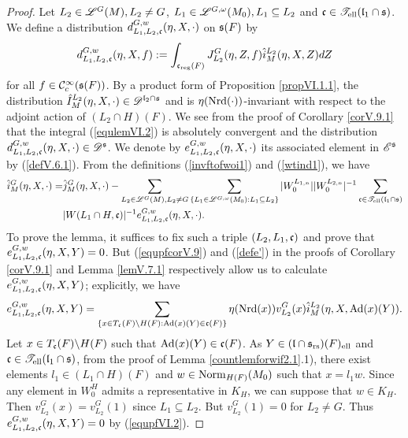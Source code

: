 \documentclass[a4paper]{amsart}
\newcommand{\mse}{\mathscr{E}}\newcommand{\msf}{\mathscr{F}}\newcommand{\msg}{\mathscr{G}}\newcommand{\msh}{\mathscr{H}}
\theoremstyle{definition}
\theoremstyle{remark}
\numberwithin{equation}{subsection}
\begin{document}
\begin{proof}
Let $L_2\in\mathscr{L}^{G}(M), L_2\neq G$, $L_1\in\mathscr{L}^{G, \omega}(M_0), L_1\subseteq L_2$ and ${\mathfrak{c}}\in\mathscr{T}_{\mathrm{ell}}({\mathfrak{l}}_1\cap{\mathfrak{s}})$. 
We define a distribution $d_{L_1,L_2,{\mathfrak{c}}}^{G, w}(\eta, X, \cdot)$ on ${\mathfrak{s}}(F)$ by
\begin{equation}\label{equlemVI.2}
 d_{L_1,L_2,{\mathfrak{c}}}^{G, w}(\eta, X, f):=\int_{{\mathfrak{c}}_{\mathrm{reg}}(F)} J_{L_2}^G(\eta, Z, f) \hat{i}_M^{L_2}(\eta, X, Z) dZ 
\end{equation}
for all $f\in{\mathcal {C}}_c^\infty({\mathfrak{s}}(F))$. By a product form of Proposition \ref{propVI.1.1}, the distribution $\hat{I}_M^{L_2}(\eta, X, \cdot)\in\mathscr{D}^{{\mathfrak{l}}_2\cap{\mathfrak{s}}}$ and is $\eta({\mathrm{Nrd}}(\cdot))$-invariant with respect to the adjoint action of $(L_2\cap H)(F)$. We see from the proof of Corollary \ref{corV.9.1} that the integral (\ref{equlemVI.2}) is absolutely convergent and the distribution $d_{L_1,L_2,{\mathfrak{c}}}^{G, w}(\eta, X, \cdot)\in\mathscr{D}^{\mathfrak{s}}$. We denote by $e_{L_1,L_2,{\mathfrak{c}}}^{G, w}(\eta, X, \cdot)$ its associated element in $\mse^\fs$ by (\ref{defV.6.1}). From the definitions (\ref{invftofwoi1}) and (\ref{wtind1}), we have
\[\begin{split} 
\hat{i}_M^G(\eta, X, \cdot)=&\hat{j}_M^G(\eta, X, \cdot)-\sum_{L_2\in\mathscr{L}^G(M), L_2\neq G} \sum_{\{L_1\in\mathscr{L}^{G,\omega}(M_0): L_1\subseteq L_2\}} |W_0^{L_{1,n}}| |W_0^{L_{2,n}}|^{-1}\sum_{{\mathfrak{c}}\in\mathscr{T}_{\mathrm{ell}}({\mathfrak{l}}_1\cap{\mathfrak{s}})} \\ 
&|W(L_{1}\cap H,{\mathfrak{c}})|^{-1} e_{L_1,L_2,{\mathfrak{c}}}^{G, w}(\eta, X, \cdot). 
\end{split}\]
To prove the lemma, it suffices to fix such a triple $(L_2, L_1, {\mathfrak{c}})$ and prove that $e_{L_1,L_2,{\mathfrak{c}}}^{G, w}(\eta, X, Y)=0$. But (\ref{equpfcorV.9}) and (\ref{defe'}) in the proofs of Corollary \ref{corV.9.1} and Lemma \ref{lemV.7.1} respectively allow us to calculate $e_{L_1,L_2,{\mathfrak{c}}}^{G, w}(\eta, X, Y)$; explicitly, we have
\begin{equation}\label{equpfVI.2}
 e_{L_1,L_2,{\mathfrak{c}}}^{G, w}(\eta, X, Y)=\sum_{\{x\in T_{\mathfrak{c}}(F)\backslash H(F):{\mathrm{Ad}}(x)(Y)\in {\mathfrak{c}}(F)\}} \eta({\mathrm{Nrd}}(x)) v_{L_2}^G(x) \hat{i}_M^{L_2}(\eta, X, {\mathrm{Ad}}(x)(Y)). 
\end{equation}
Let $x\in T_{\mathfrak{c}}(F)\backslash H(F)$ such that ${\mathrm{Ad}}(x)(Y)\in {\mathfrak{c}}(F)$. As $Y\in({\mathfrak{l}}\cap{\mathfrak{s}}_{\mathrm{rs}})(F)_{\mathrm{ell}}$ and ${\mathfrak{c}}\in\mathscr{T}_{\mathrm{ell}}({\mathfrak{l}}_1\cap{\mathfrak{s}})$, from the proof of Lemma \ref{countlemforwif2.1}.1), there exist elements $l_1\in (L_1\cap H)(F)$ and $w\in{\mathrm{Norm}}_{H(F)}(M_0)$ such that $x=l_1 w$. Since any element in $W_0^H$ admits a representative in $K_H$, we can suppose that $w\in K_H$. Then $v_{L_2}^G(x)=v_{L_2}^G(1)$ since $L_1\subseteq L_2$. But $v_{L_2}^G(1)=0$ for $L_2\neq G$. Thus $e_{L_1,L_2,{\mathfrak{c}}}^{G, w}(\eta, X, Y)=0$ by (\ref{equpfVI.2}). 
\end{proof}
\end{document}
